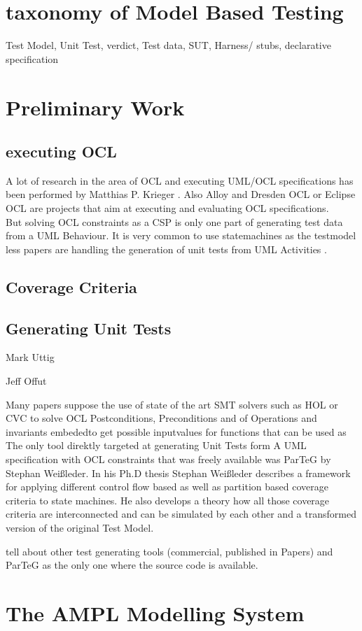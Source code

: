 \section{taxonomy of Model Based Testing}
Test Model,
Unit Test,
verdict,
Test data,
SUT,
Harness/ stubs,
declarative specification

\section{Preliminary Work}
\label{sec:RelatedWork}
\subsection{executing OCL}
A lot of research in the area of OCL and executing UML/OCL specifications has been performed by Matthias P. Krieger \cite{krieger2008executingUnderspecifiedOCL}. Also Alloy and Dresden OCL or Eclipse OCL are projects that aim at executing and evaluating OCL specifications. 
\\
But solving OCL constraints as a CSP is only one part of generating test data from a UML Behaviour.
It is very common to use statemachines as the testmodel less papers are handling the generation of unit tests from UML Activities\cite{Linzhang04GeneratingTestCasefromActivityGrayBoxMethod}
\cite{Patel12TestCaseFormationUsigUMLActivityDiagram}
\cite{Pechtanun12GeneratingTestCaseFromUMLActivityDiagramBasedOnACGrammar}
\cite{Xu09ModelCheckingUMLActivities}\cite{Xu09ModelCheckingUMLActivityDiagramsFDR}. 


\subsection{Coverage Criteria}


\subsection{Generating Unit Tests}
Mark Uttig

Jeff Offut

Many papers suppose the use of state of the art SMT solvers such as HOL or CVC to solve OCL Postconditions, Preconditions and  of Operations and invariants embededto get possible inputvalues for functions that can be used as 
The only tool direktly targeted at generating Unit Tests form A UML specification with OCL constraints that was freely available was ParTeG by Stephan Weißleder. In his Ph.D thesis Stephan Weißleder describes a framework for applying different control flow based as well as partition based coverage criteria to state machines. He also develops a theory how all those coverage criteria are interconnected and can be simulated by each other and a transformed version of the original Test Model\cite{ParTeG}.


tell about other test generating tools (commercial, published in Papers) and ParTeG as the only one where the source code is available.\cite{ParTeG}

\section{The AMPL Modelling System}
\label{sec:AMPL}
\cite{AMPL}
